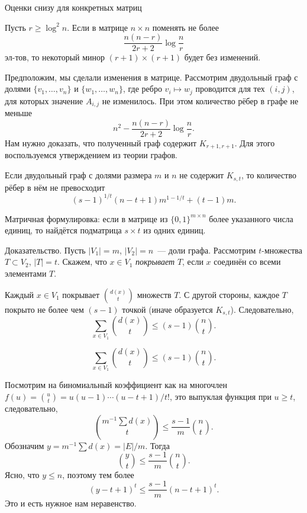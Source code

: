 \documentclass[handout]{beamer}
\renewcommand\le{\leqslant}
\renewcommand\ge{\geqslant}
\begin{document}
\begin{frame}{Оценки снизу для конкретных матриц}
    \begin{lemma}
        Пусть $r\ge \log^2n$. Если в матрице $n\times n$ поменять не
        более
        $$
        \frac{n(n-r)}{2r+2}\log\frac{n}{r}
        $$
        эл-тов, то некоторый минор $(r+1)\times (r+1)$ будет без изменений.
    \end{lemma}
    \pause

    Предположим, мы сделали изменения в матрице. Рассмотрим двудольный граф с
    долями $\{v_1,\ldots,v_n\}$ и $\{w_1,\ldots,w_n\}$, где ребро $v_i\mapsto
    w_j$ проводится для тех $(i,j)$, для которых значение $A_{i,j}$ не
    изменилось. При этом количество рёбер в графе не меньше
    $$
    n^2 - \frac{n(n-r)}{2r+2}\log\frac{n}{r}.
    $$
    Нам нужно доказать, что полученный граф содержит $K_{r+1,r+1}$.
    Для этого воспользуемся утверждением из теории графов.
\end{frame}

\begin{frame}
    \begin{lemma}
        Если двудольный граф с долями размера $m$ и $n$ не содержит $K_{s,t}$,
        то количество рёбер в нём не превосходит
        $$
        (s-1)^{1/t}(n-t+1)m^{1-1/t}+(t-1)m.
        $$
    \end{lemma}
    \pause
    Матричная формулировка: если в матрице из $\{0,1\}^{m\times n}$ более
    указанного числа единиц, то найдётся подматрица $s\times t$ из одних единиц.
    \pause

    Доказательство.
        Пусть $|V_1|=m$, $|V_2|=n$~--- доли графа.
        Рассмотрим $t$-множества $T\subset V_2$, $|T|=t$. Скажем, что $x\in V_1$
        \textit{покрывает} $T$, если $x$ соединён со всеми элементами $T$.
        \pause

        Каждый $x\in V_1$ покрывает $\binom{d(x)}{t}$ множеств $T$. С другой
        стороны, каждое $T$ покрыто не более чем $(s-1)$ точкой (иначе
        образуется $K_{s,t}$). Следовательно,
        $$
        \sum_{x\in V_1}\binom{d(x)}{t} \le (s-1)\binom{n}{t}.
        $$

\end{frame}

    \begin{frame}
        $$
        \sum_{x\in V_1}\binom{d(x)}{t} \le (s-1)\binom{n}{t}.
        $$

        Посмотрим на биномиальный коэффициент как на многочлен
        $f(u)=\binom{u}{t}=u(u-1)\cdots(u-t+1)/t!$, это выпуклая функция при
        $u\ge t$, следовательно,
        $$
        \binom{m^{-1}\sum d(x)}{t} \le \frac{s-1}{m}\binom{n}{t}.
        $$
        \pause
        Обозначим $y=m^{-1}\sum d(x)=|E|/m$. Тогда
        $$
        \binom{y}{t}\le\frac{s-1}{m}\binom{n}{t}.$$
        \pause
        Ясно, что $y\le n$, поэтому тем более
        $$
        (y-t+1)^t \le \frac{s-1}{m}(n-t+1)^t.
        $$
        Это и есть нужное нам неравенство.


\end{frame}
\end{document}
